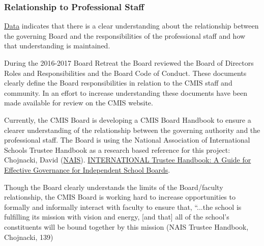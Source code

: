 \subsubsection{Relationship to Professional Staff}



\begin{findings}
\href{https://docs.google.com/a/cmis.ac.th/document/d/1_otvw47y3Z-1CSjXnKhgRTauVRqPl1S6nSdmsb00O2k/edit?usp=sharing}{Data} indicates that there is a clear understanding about the relationship between the governing Board and the responsibilities of the professional staff and how that understanding is maintained. 

During the 2016-2017 Board Retreat the Board reviewed the Board of Directors Roles and Responsibilities and the Board Code of Conduct. These documents clearly define the Board responsibilities in relation to the CMIS staff and community. In an effort to increase understanding these documents have been made available for review on the CMIS website.

Currently, the CMIS Board is developing a CMIS Board Handbook to ensure a clearer understanding of the relationship between the governing authority and the professional staff. The Board is using the National Association of International Schools Trustee Handbook as a research based reference for this project: Chojnacki, David (\href{http://www.nais.org/Articles/Pages/NAIS-Trustee-Handbook-Resources.aspx}{NAIS}). \href{https://www.nais.org/Bookstore/Pages/ProductDetail.aspx?productid=\%7B47CD9104-BC67-E111-9A8C-00505683000D\%7D}{INTERNATIONAL Trustee Handbook: A Guide for Effective Governance for Independent School Boards}. 

Though the Board clearly understands the limits of the Board/faculty relationship, the CMIS Board is working hard to increase opportunities to formally and informally interact with faculty to ensure that, “...the school is fulfilling its mission with vision and energy, [and that]  all  of the school’s constituents will be bound together by this mission (NAIS Trustee Handbook, Chojnacki, 139)  


\end{findings}
